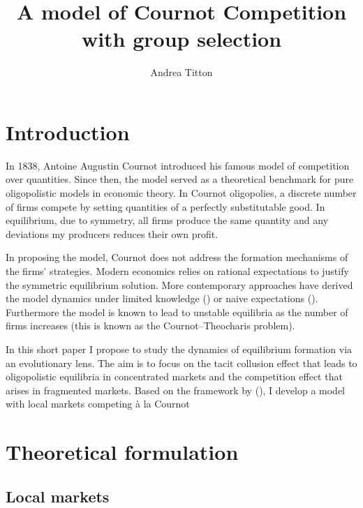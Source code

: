 \documentclass[american]{scrartcl}
\title{A model of Cournot Competition with group selection}
\author{Andrea Titton}
\begin{document}

\maketitle

\section{Introduction}

In 1838, Antoine Augustin Cournot introduced his famous model of competition over quantities. Since then, the model served as a theoretical benchmark for pure oligopolistic models in economic theory. In Cournot oligopolies, a discrete number of firms compete by setting quantities of a perfectly substitutable good. In equilibrium, due to symmetry, all firms produce the same quantity and any deviations my producers reduces their own profit.

In proposing the model, Cournot does not address the formation mechanisms of the firms' strategies. Modern economics relies on rational expectations to justify the symmetric equilibrium solution. More contemporary approaches have derived the model dynamics under limited knowledge (\cite{Bischi2015}) or naive expectations (\cite{Cnovas2008}). Furthermore the model is known to lead to unstable equilibria as the number of firms increases (this is known as the Cournot–Theocharis problem).

In this short paper I propose to study the dynamics of equilibrium formation via an evolutionary lens. The aim is to focus on the tacit collusion effect that leads to oligopolistic equilibria in concentrated markets and the competition effect that arises in fragmented markets. Based on the framework by \citeauthor{Akdeniz2020} (\citeyear{Akdeniz2020}), I develop a model with local markets competing à la Cournot %

\iffalse
    \newpage
    \section{Literature review}
\fi

\newpage
\section{Theoretical formulation}

\subsection{Local markets}
\end{document}
